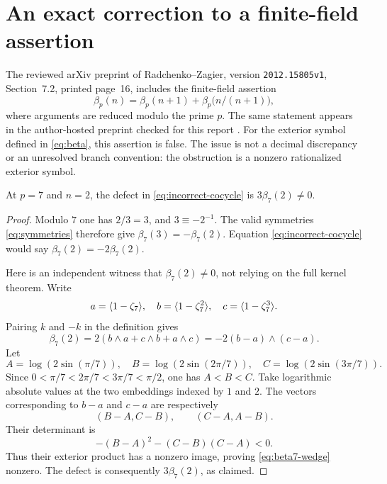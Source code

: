 \section{An exact correction to a finite-field assertion}
\label{sec:audit}

The reviewed arXiv preprint of Radchenko--Zagier, version
\texttt{2012.15805v1}, Section~7.2, printed page~16, includes the
finite-field assertion
\begin{equation}\label{eq:incorrect-cocycle}
 \beta_p(n)=\beta_p(n+1)+\beta_p\bigl(n/(n+1)\bigr),
\end{equation}
where arguments are reduced modulo the prime $p$. The same statement
appears in the author-hosted preprint checked for this report
\cite{RZ}. For the exterior symbol defined in \eqref{eq:beta}, this
assertion is false. The issue is not a decimal discrepancy or an
unresolved branch convention: the obstruction is a nonzero rationalized
exterior symbol.

\begin{proposition}\label{prop:counterexample}
At $p=7$ and $n=2$, the defect in \eqref{eq:incorrect-cocycle} is
$3\beta_7(2)\ne0$.
\end{proposition}
\begin{proof}
Modulo $7$ one has $2/3=3$, and $3\equiv-2^{-1}$. The valid
symmetries \eqref{eq:symmetries} therefore give
$\beta_7(3)=-\beta_7(2)$. Equation
\eqref{eq:incorrect-cocycle} would say
$\beta_7(2)=-2\beta_7(2)$.

Here is an independent witness that $\beta_7(2)\ne0$, not relying on
the full kernel theorem. Write
\[
 a=\langle 1-\zeta_7\rangle,\quad b=\langle 1-\zeta_7^2\rangle,\quad
 c=\langle 1-\zeta_7^3\rangle.
\]
Pairing $k$ and $-k$ in the definition gives
\begin{equation}\label{eq:beta7-wedge}
 \beta_7(2)=2(b\wedge a+c\wedge b+a\wedge c)
          =-2(b-a)\wedge(c-a).
\end{equation}
Let
\[
 A=\log(2\sin(\pi/7)),\quad B=\log(2\sin(2\pi/7)),\quad
 C=\log(2\sin(3\pi/7)).
\]
Since $0<\pi/7<2\pi/7<3\pi/7<\pi/2$, one has $A<B<C$.
Take logarithmic absolute values at the two embeddings indexed by
$1$ and $2$. The vectors corresponding to $b-a$ and $c-a$ are
respectively
\[
 (B-A,C-B),\qquad(C-A,A-B).
\]
Their determinant is
\begin{equation}\label{eq:det-witness}
 -(B-A)^2-(C-B)(C-A)<0.
\end{equation}
Thus their exterior product has a nonzero image, proving
\eqref{eq:beta7-wedge} nonzero. The defect is consequently
$3\beta_7(2)$, as claimed.
\end{proof}

